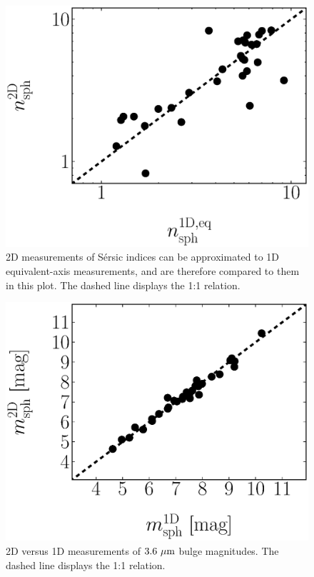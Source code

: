 \documentclass[preprint2]{emulateapj}
\begin{document}
\begin{figure}[h]
\begin{center}
\includegraphics[width=\columnwidth]{images/comparison_n.eps} 
\caption{2D measurements of S\'ersic indices can be approximated to 1D equivalent-axis measurements, 
and are therefore compared to them in this plot. The dashed line displays the 1:1 relation.}
\label{fig:n1d2d}
\end{center}
\end{figure}

\begin{figure}[h]
\begin{center}
\includegraphics[width=\columnwidth]{images/comparison_mag.eps} 
\caption{2D versus 1D measurements of $3.6~\rm \mu m$ bulge magnitudes. The dashed line displays the 1:1 relation.}
\label{fig:mag1d2d}
\end{center}
\end{figure}
\end{document}
